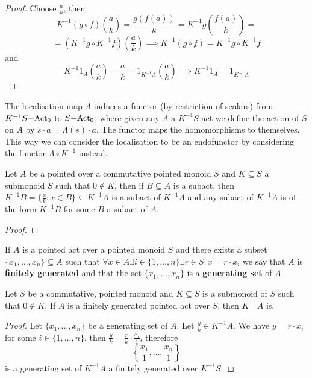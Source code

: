 \begin{proof}[Proof]
    Choose $\frac{a}{k}$, then
    \[
    K^{-1}(g\circ f)\left(\frac{a}{k}\right) = \frac{g(f(a))}{k} = K^{-1}g\left(\frac{f(a)}{k}\right) =\] \[=(K^{-1}g\circ K^{-1}f)(\frac{a}{k}) \implies K^{-1}(g\circ f) = K^{-1}g\circ K^{-1}f
    \]
    and 
    \[
        K^{-1}1_A\left(\frac{a}{k}\right) = \frac{a}{k} = 1_{K^{-1}A}(\frac{a}{k}) \implies K^{-1}1_A = 1_{K^{-1}A}
    \]
\end{proof}
\begin{remark}
    The localisation map $\Lambda$ induces a functor (by restriction of scalars) from $K^{-1}S\mathrm{-Act}_0$ to $S\mathrm{-Act}_0$, where given any 
    $A$ a $K^{-1}S$ act we define the action of $S$ on $A$ by $s\cdot a = \Lambda(s)\cdot a$. The functor maps the 
    homomorphisms to themselves. This way we can consider the 
    localisation to be an endofunctor by considering the functor $\Lambda\circ K^{-1}$ instead. 
\end{remark}
\begin{proposition}
    Let $A$ be a pointed over a commutative pointed monoid $S$ and $K\subseteq S$ a submonoid $S$ such that $0\not\in K$, then 
    if $B\subseteq A$ is a subact, then $K^{-1}B = \{\frac{x}{k}: x \in B\}\subseteq K^{-1}A$ is a subact of $K^{-1}A$ and any subact of $K^{-1}A$ is of the form
    $K^{-1} B$ for some $B$ a subact of $A$.
\end{proposition}
\begin{proof}
    
\end{proof}
\begin{definition}
    If $A$ is a pointed act over a pointed monoid $S$ and there exists a subset $\{x_1,\dots,x_n\}\subseteq A$ such that 
    $\forall x\in A \exists i\in\{1,\dots,n\} \exists r\in S : x = r\cdot x_i$ we say that $A$ is \textbf{finitely generated} 
    and that the set $\{x_1,\dots,x_n\}$ is a \textbf{generating set} of $A$.
\end{definition}
\begin{proposition}
    Let $S$ be a commutative, pointed monoid and $K\subseteq S$ is a submonoid of $S$ such that $0\not\in K$.
    If $A$ is a finitely generated pointed act over $S$, then $K^{-1} A$ is.
\end{proposition}
\begin{proof}
    Let $\{x_1,\dots,x_n\}$ be a generating set of $A$. Let $\frac{y}{k}\in K^{-1} A$. We have $y=r\cdot x_i$ for some $i\in\{1,\dots, n\}$,
    then $\frac{y}{k} = \frac{r}{k}\cdot\frac{x_i}{1}$, therefore 
    \[
        \left\{\frac{x_1}{1},\dots,\frac{x_n}{1}\right\}
    \]
    is a generating set of $K^{-1} A$ a finitely generated over $K^{-1}S$.
\end{proof}
